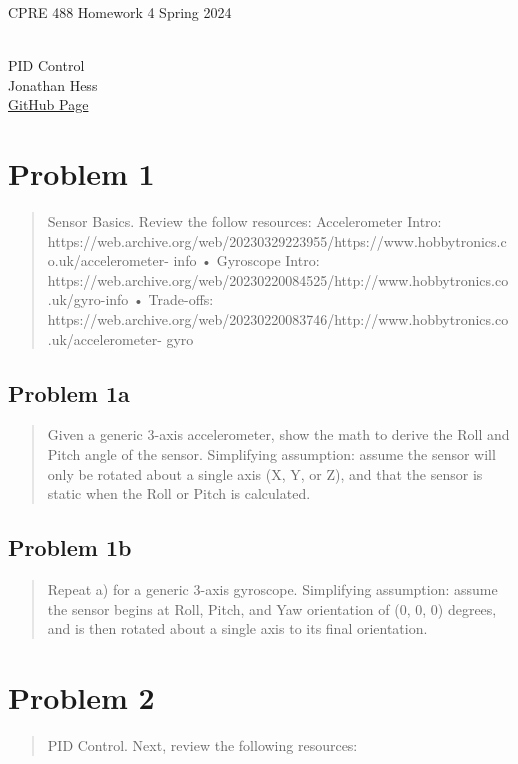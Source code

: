 \documentclass[10pt,a4paper]{article}
\author{}
\date{}
\let\oldsubsection\subsection
\renewcommand{\subsection}{%
    \setcounter{equation}{0}%
    \oldsubsection%
}
\begin{document}
\begin{flushleft}
\begin{LARGE}CPRE 488 Homework 4 Spring 2024
\end{LARGE}
\\PID Control
\\Jonathan Hess
\\\href{https://github.com/Jetsama/CPRE488/tree/main/HW4}{GitHub Page}
\end{flushleft}

\section{Problem 1}
\begin{quote}
Sensor Basics. Review the follow resources:
Accelerometer Intro:
https://web.archive.org/web/20230329223955/https://www.hobbytronics.co.uk/accelerometer-
info
• Gyroscope Intro:
https://web.archive.org/web/20230220084525/http://www.hobbytronics.co.uk/gyro-info
• Trade-offs:
https://web.archive.org/web/20230220083746/http://www.hobbytronics.co.uk/accelerometer-
gyro
\end{quote}


\subsection{Problem 1a}\begin{quote}
Given a generic 3-axis accelerometer, show the math to derive the Roll and Pitch angle of the sensor.
Simplifying assumption: assume the sensor will only be rotated about a single axis (X, Y, or Z), and that
the sensor is static when the Roll or Pitch is calculated.
\end{quote}



\subsection{Problem 1b}\begin{quote}
Repeat a) for a generic 3-axis gyroscope. Simplifying assumption: assume the sensor begins at Roll,
Pitch, and Yaw orientation of (0, 0, 0) degrees, and is then rotated about a single axis to its final
orientation.
\end{quote}



\section{Problem 2}
\begin{quote}
PID Control. Next, review the following resources:
\href{http://en.wikipedia.org/wiki/PID_controller}
\href{https://sites.google.com/site/fpgaandco/pid-demo}\\
\end{quote}
\end{document}
